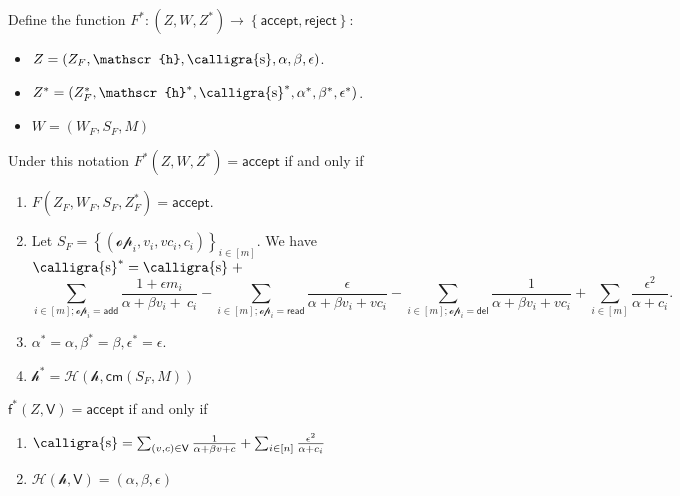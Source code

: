 \documentclass[11pt]{article} %
\newcommand{\cm}{\ensuremath{\mathsf{cm}}\xspace}
\newcommand{\rej}{\ensuremath{\mathsf{reject}}\xspace}
\newcommand{\acc}{\ensuremath{\mathsf{accept}}\xspace}
\newcommand{\hash}{\ensuremath{\mathcal{H}}\xspace}
\newcommand{\sett}[2]{\ensuremath{\set{#1}_{#2}}\xspace}
\newcommand{\eps}{\ensuremath{\epsilon}\xspace}
\newcommand{\set}[1]{\ensuremath{\left\{#1\right\}}\xspace}
\newcommand{\sumi}[1]{\sum_{i\in[#1]}}
\newcommand{\add}{\ensuremath{\mathsf{add}}\xspace}
\newcommand{\del}{\ensuremath{\mathsf{del}}\xspace}
\renewcommand{\read}{\ensuremath{\mathsf{read}}\xspace}
\newcommand{\op}{\ensuremath{\mathscr{op}}\xspace}
\newcommand{\recset}{\ensuremath{\mathsf{V}}\xspace}
\newcommand{\incsum}{\ensuremath{\text{\calligra{s}}}\xspace}
\newcommand{\inchash}{\ensuremath{\mathscr{h}}\xspace}
\newcommand{\finpred}{\ensuremath{\mathsf{f}}\xspace}
\begin{document}
Define the function $F^*:(Z,W,Z^*)\to \set{\acc,\rej}$:
\begin{itemize}
 \item $Z=(Z_F,\inchash,\incsum,\alpha,\beta,\epsilon)$.
 \item $Z^*=(Z_F^*,\inchash^*,\incsum^*,\alpha^*,\beta^*,\epsilon^*)$.
 \item $W=(W_F,S_F,M)$
\end{itemize}
\noindent
Under this notation
$F^*(Z,W,Z^*)=\acc$ if and only if
\begin{enumerate}
\item $F(Z_F,W_F,S_F,Z_F^*)=\acc$.

\item Let $S_F=\sett{(\op_i,v_i,vc_i,c_i)}{i\in [m]}$. We have \\
$\incsum^*=\incsum\;+$
\[\sum_{i\in [m];\op_i = \add}\frac{1+ \eps m_i}{\alpha +\beta v_i+\ c_i}-\sum_{i\in [m];\op_i = \read}\frac{ \eps }{\alpha +\beta v_i+vc_i}-\sum_{i\in [m];\op_i = \del}\frac{ 1 }{\alpha +\beta v_i+ vc_i}+ \sumi{m}\frac{\epsilon^2}{\alpha+c_i}.\]
\item $\alpha^*=\alpha, \beta^*=\beta,\epsilon^*=\epsilon$.
\item $\inchash^*=\hash(\inchash,\cm(S_F,M))$ \\
\end{enumerate}

\noindent $\finpred^*(Z,\recset)=\acc$ if and only if
\begin{enumerate}
 \item $\incsum=\sum_{(v,c)\in \recset} \frac{1}{\alpha + \beta v+ c}+\sumi{n}\frac{\epsilon^2}{\alpha+c_i}$
 \item $\hash(\inchash,\recset)=(\alpha,\beta,\epsilon)$
\end{enumerate}
\end{document}
